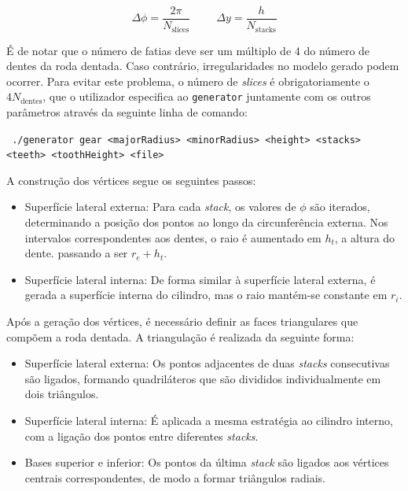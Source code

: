 \documentclass[12pt, a4paper]{article}
\begin{document}
$$
\Delta \phi = \frac{2\pi}{N_\text{slices}}
\hspace{1cm}
\Delta y = \frac{h}{N_\text{stacks}}
$$

É de notar que o número de fatias deve ser um múltiplo de 4 do número de dentes da roda dentada.
Caso contrário, irregularidades no modelo gerado podem ocorrer. Para evitar este problema, o número
de \emph{slices} é obrigatoriamente o $4 N_\text{dentes}$, que o utilizador especifica ao
\texttt{generator} juntamente com os outros parâmetros através da seguinte linha de comando:

\begin{adjustwidth}{-2cm}{-2cm} %
    \begin{center}
        \texttt{
        ./generator gear <majorRadius> <minorRadius> <height> <stacks> <teeth> <toothHeight> <file>
        }
    \end{center}
\end{adjustwidth}

A construção dos vértices segue os seguintes passos:

\begin{itemize}
    \item Superfície lateral externa: Para cada \emph{stack}, os valores de $\phi$ são iterados,
        determinando a posição dos pontos ao longo da circunferência externa. Nos intervalos
        correspondentes aos dentes, o raio é aumentado em $h_t$, a altura do dente. passando a ser
        $r_e + h_t$.

    \item Superfície lateral interna: De forma similar à superfície lateral externa, é gerada a
        superfície interna do cilindro, mas o raio mantém-se constante em $r_i$.
\end{itemize}

Após a geração dos vértices, é necessário definir as faces triangulares que compõem a roda dentada.
A triangulação é realizada da seguinte forma:

\begin{itemize}
    \item Superfície lateral externa: Os pontos adjacentes de duas \emph{stacks} consecutivas são
        ligados, formando quadriláteros que são divididos individualmente em dois triângulos.

    \item Superfície lateral interna: É aplicada a mesma estratégia ao cilindro interno, com a
        ligação dos pontos entre diferentes \emph{stacks}.

    \item Bases superior e inferior: Os pontos da última \emph{stack} são ligados aos vértices
        centrais correspondentes, de modo a formar triângulos radiais.
\end{itemize}
\end{document}
